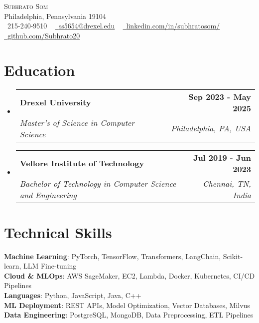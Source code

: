 \documentclass[letterpaper,11pt]{article}
\makeatletter
\newcommand{\resumeSubheading}[4]{
  \vspace{-2pt}\item
    \begin{tabular*}{1.0\textwidth}[t]{l@{\extracolsep{\fill}}r}
      \textbf{#1} & \textbf{\small #2} \\
      \textit{\small#3} & \textit{\small #4} \\
    \end{tabular*}\vspace{-7pt}
}
\newcommand{\resumeSubHeadingListStart}{\begin{itemize}[leftmargin=0.0in, label={}]}
\newcommand{\resumeSubHeadingListEnd}{\end{itemize}}
\makeatother
\begin{document}

\vspace{-16pt}
\begin{center}
    {\Huge \scshape Subhrato Som} \\ \vspace{1pt}
    Philadelphia, Pennsylvania 19104 \\ \vspace{1pt}
    \small \raisebox{-0.1\height}\faPhone\ 215-240-9510 ~ \href{mailto:ss5654@drexel.edu}{\raisebox{-0.2\height}\faEnvelope\  \underline{ss5654@drexel.edu}} ~ 
    \href{https://linkedin.com/in/subhratosom/}{\raisebox{-0.2\height}\faLinkedin\ \underline{linkedin.com/in/subhratosom/}}  ~
    \href{https://github.com/Subhrato20}{\raisebox{-0.2\height}\faGithub\ \underline{github.com/Subhrato20}}
    \vspace{-8pt}
\end{center}

\section{Education}
  \resumeSubHeadingListStart
  
    \resumeSubheading
      {Drexel University}{Sep 2023 - May 2025}
      {Master's of Science in Computer Science}{Philadelphia, PA, USA}

    \vspace{-5pt}
    \resumeSubheading
      {Vellore Institute of Technology}{Jul 2019 - Jun 2023}
      {Bachelor of Technology in Computer Science and Engineering}{Chennai, TN, India}

  
  \resumeSubHeadingListEnd
\vspace{-15pt}

\section{Technical Skills}

\begin{itemize}[leftmargin=0.15in, label={}]
	\small{\item{
		\textbf{Machine Learning}{: PyTorch, TensorFlow, Transformers, LangChain, Scikit-learn, LLM Fine-tuning} \\
		\textbf{Cloud \& MLOps}{: AWS SageMaker, EC2, Lambda, Docker, Kubernetes, CI/CD Pipelines} \\
		\textbf{Languages}{: Python, JavaScript, Java, C++} \\
		\textbf{ML Deployment}{: REST APIs, Model Optimization, Vector Databases, Milvus} \\
		\textbf{Data Engineering}{: PostgreSQL, MongoDB, Data Preprocessing, ETL Pipelines}
	}}
\end{itemize}
\vspace{-18pt}
\end{document}
